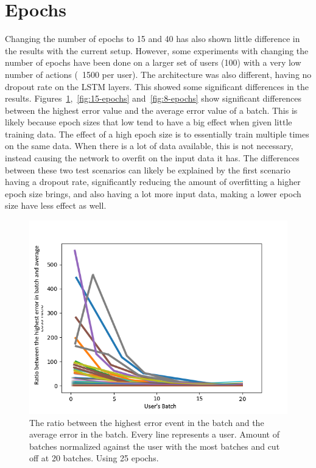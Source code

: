 \section{Epochs}
Changing the number of epochs to 15 and 40 has also shown little difference in the results with the current setup. However, some experiments with changing the number of epochs have been done on a larger set of users (100) with a very low number of actions (~1500 per user). The architecture was also different, having no dropout rate on the LSTM layers. This showed some significant differences in the results. Figures~\ref{fig:25-epochs},~\ref{fig:15-epochs} and~\ref{fig:8-epochs} show significant differences between the highest error value and the average error value of a batch. This is likely because epoch sizes that low tend to have a big effect when given little training data. The effect of a high epoch size is to essentially train multiple times on the same data. When there is a lot of data available, this is not necessary, instead causing the network to overfit on the input data it has. The differences between these two test scenarios can likely be explained by the first scenario having a dropout rate, significantly reducing the amount of overfitting a higher epoch size brings, and also having a lot more input data, making a lower epoch size have less effect as well.

\begin{figure}[H]
	\begin{center}
		\includegraphics[scale=0.7]{experiments/epochs/25-epochs.png}
	\end{center}
	\caption{The ratio between the highest error event in the batch and the average error in the batch. Every line represents a user. Amount of batches normalized against the user with the most batches and cut off at 20 batches. Using 25 epochs.~\label{fig:25-epochs}}
\end{figure}


